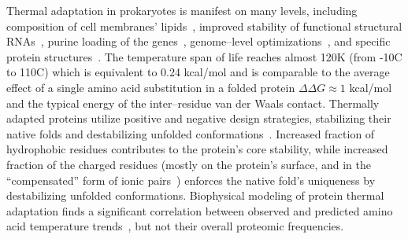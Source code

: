 \documentclass[10pt,letterpaper]{article}
\begin{document}
Thermal adaptation in prokaryotes is manifest on many levels, including composition of cell membranes' lipids~\cite{Chugunov2014Liquid},  improved stability of functional structural RNAs~\cite{Galtier1997Relationships}, purine loading of the genes~\cite{Lambros2003Optimum},  genome--level optimizations~\cite{Sabath2013Growth,Saha2015Overlapping},  and specific protein structures~\cite{Szilagyi2000Structural,England2003Natural}. The temperature span of life reaches almost 120K (from -10\textdegree C to 110\textdegree C) which is equivalent to 0.24 kcal/mol and is comparable to the average effect of a single amino acid substitution in a folded protein $\Delta\Delta G\approx 1$ kcal/mol~\cite{Zeldovich2007Proteinb} and the typical energy of the inter--residue van der Waals contact. Thermally adapted proteins utilize positive and negative design strategies, stabilizing their native folds and destabilizing unfolded conformations~\cite{Berezovsky2007Positive}. Increased fraction of hydrophobic residues contributes to the protein's core stability, while increased fraction of the charged residues (mostly on the protein's surface, and in the ``compensated'' form of ionic pairs~\cite{Szilagyi2000Structural,Zhao2011Charged}) enforces the native fold's uniqueness by destabilizing unfolded conformations.  Biophysical modeling of protein thermal adaptation finds a significant correlation between observed and predicted amino acid temperature trends~\cite{Berezovsky2007Positive,Venev2015Massively}, but not their overall proteomic frequencies. 
\end{document}
